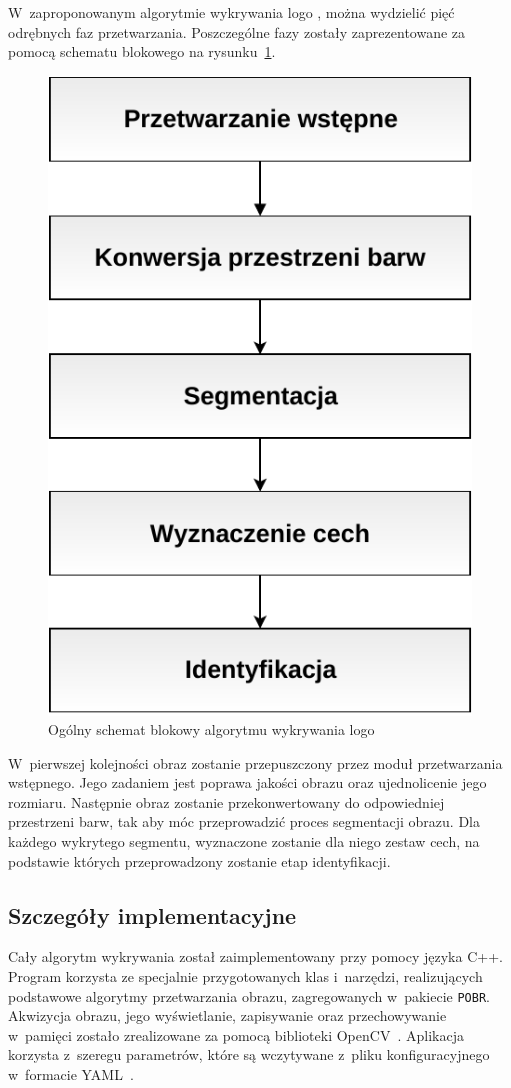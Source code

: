 W~zaproponowanym algorytmie wykrywania logo \bk, można wydzielić pięć odrębnych faz przetwarzania. Poszczególne fazy zostały zaprezentowane za pomocą schematu blokowego na rysunku~\ref{fig:algorithm-overview}.

\begin{figure}
    \centering
    \includegraphics[width=0.6\columnwidth]{figures/algorithmOverview.pdf}
    \caption{Ogólny schemat blokowy algorytmu wykrywania logo \bk}
    \label{fig:algorithm-overview}
\end{figure}

W~pierwszej kolejności obraz zostanie przepuszczony przez moduł przetwarzania wstępnego. Jego zadaniem jest poprawa jakości obrazu oraz ujednolicenie jego rozmiaru.
Następnie obraz zostanie przekonwertowany do odpowiedniej przestrzeni barw, tak aby móc przeprowadzić proces segmentacji obrazu. Dla każdego wykrytego segmentu, wyznaczone zostanie dla niego zestaw cech, na podstawie których przeprowadzony zostanie etap identyfikacji.

\subsection{Szczegóły implementacyjne}
Cały algorytm wykrywania został zaimplementowany przy pomocy języka C++. Program korzysta ze specjalnie przygotowanych klas i~narzędzi, realizujących podstawowe algorytmy przetwarzania obrazu, zagregowanych w~pakiecie \texttt{POBR}. Akwizycja obrazu, jego wyświetlanie, zapisywanie oraz przechowywanie w~pamięci zostało zrealizowane za pomocą biblioteki OpenCV~\cite{opencv}. Aplikacja korzysta z~szeregu parametrów, które są wczytywane z~pliku konfiguracyjnego w~formacie YAML~\cite{swierczynski2008podwyzszanie}.
